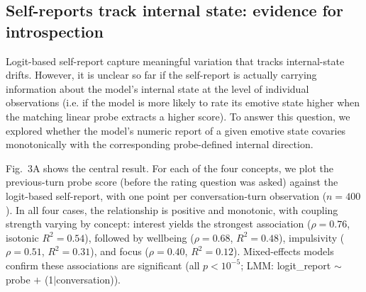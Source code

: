 \documentclass[10pt]{article}
\begin{document}
\subsection{Self-reports track internal state: evidence for introspection}
\label{sec:results-introspection}

Logit-based self-report capture meaningful variation that tracks internal-state drifts. However, it is unclear so far if the self-report is actually carrying information about the model's internal state at the level of individual observations (i.e. if the model is more likely to rate its emotive state higher when the matching linear probe extracts a higher score). To answer this question, we explored whether the model's numeric report of a given emotive state covaries monotonically with the corresponding probe-defined internal direction.

Fig.~3A shows the central result.
For each of the four concepts, we plot the previous-turn probe score (before the rating question was asked) against the logit-based self-report, with one point per conversation-turn observation ($n = 400$).
In all four cases, the relationship is positive and monotonic, with coupling strength varying by concept: interest yields the strongest association ($\rho = 0.76$, isotonic $R^2 = 0.54$), followed by wellbeing ($\rho = 0.68$, $R^2 = 0.48$), impulsivity ($\rho = 0.51$, $R^2 = 0.31$), and focus ($\rho = 0.40$, $R^2 = 0.12$).
Mixed-effects models confirm these associations are significant (all $p < 10^{-5}$; LMM: logit\_report $\sim$ probe $+$ (1$|$conversation)).
\end{document}
